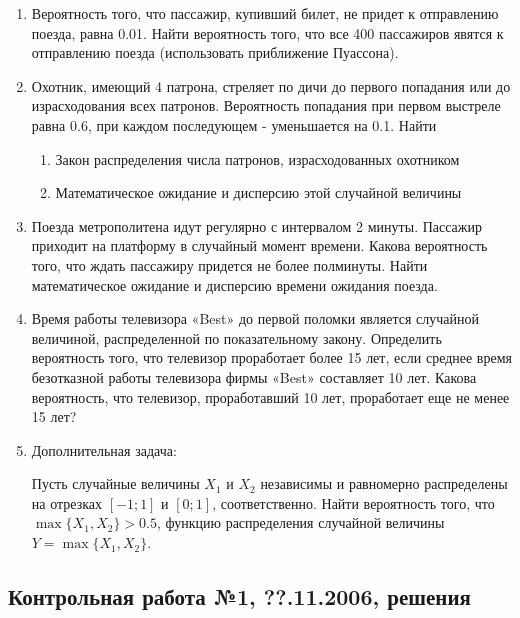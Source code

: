 \begin{enumerate}
\item  Вероятность того, что пассажир, купивший билет, не придет к
отправлению поезда, равна 0.01. Найти вероятность того, что все
400 пассажиров явятся к отправлению поезда (использовать
приближение Пуассона).

\item Охотник, имеющий 4 патрона, стреляет по дичи до первого
попадания или до израсходования всех патронов. Вероятность
попадания при первом выстреле равна 0.6, при каждом последующем -
уменьшается на 0.1. Найти
\begin{enumerate}
\item Закон распределения числа патронов, израсходованных охотником
\item Математическое ожидание и дисперсию этой случайной величины
\end{enumerate}

\item Поезда метрополитена идут регулярно с интервалом 2 минуты.
Пассажир приходит на платформу в случайный момент времени. Какова
вероятность того, что ждать пассажиру придется не более полминуты.
Найти математическое ожидание и дисперсию времени ожидания поезда.

\item Время работы телевизора «Best» до первой поломки является
случайной величиной, распределенной по показательному закону.
Определить вероятность того, что телевизор проработает более 15
лет, если среднее время безотказной работы телевизора фирмы «Best»
составляет 10 лет. Какова вероятность, что телевизор,
проработавший 10 лет, проработает еще не менее 15 лет?


\item Дополнительная задача:

Пусть случайные величины $X_{1}$ и $X_{2}$ независимы и равномерно
распределены на отрезках $[-1;1]$ и $[0;1]$, соответственно. Найти
вероятность того, что $\max\{X_{1},X_{2}\}>0.5$, функцию
распределения случайной величины $Y=\max\{X_{1},X_{2}\}$.
\end{enumerate}

\subsection{Контрольная работа №1, ??.11.2006, решения}

